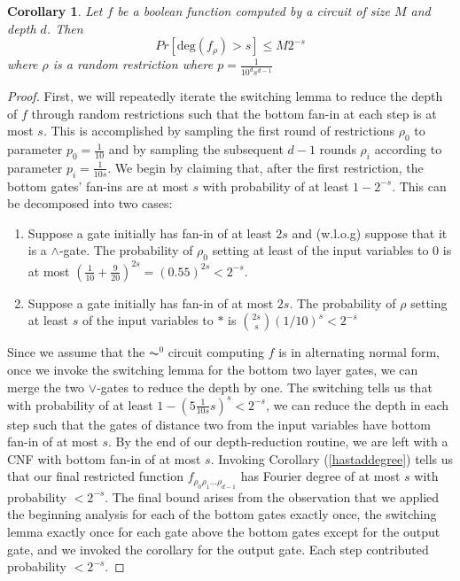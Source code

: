 \documentclass{amsart}
\newtheorem{corollary}{Corollary}[theorem]
\theoremstyle{definition}
\theoremstyle{remark}
\numberwithin{equation}{section}
\theoremstyle{remark}
\begin{document}
\begin{corollary} \label{fouriertail}
  Let $f$ be a boolean function computed by a circuit of size $M$ and depth $d$. Then
  $$ Pr[\text{deg}(f_{\rho}) > s] \leq M2^{-s} $$
  where $\rho$ is a random restriction where $p = \frac{1}{10^ds^{d-1}}$
\end{corollary}
%
\begin{proof}
   First, we will repeatedly iterate the switching lemma to reduce the depth of $f$ through random restrictions such that the bottom fan-in at each step is at most $s$. This is accomplished by sampling the first round of restrictions $\rho_0$ to parameter $p_0 = \frac{1}{10}$ and by sampling the subsequent $d-1$ rounds $\rho_i$ according to parameter $p_i = \frac{1}{10s}$. We begin by claiming that, after the first restriction, the bottom gates' fan-ins are at most $s$ with probability of at least $1 - 2^{-s}$. This can be decomposed into two cases:
   \begin{enumerate}
     \item Suppose a gate initially has fan-in of at least $2s$ and (w.l.o.g) suppose that it is a $\wedge$-gate. The probability of $\rho_0$ setting at least of the input variables to $0$ is at most $(\frac{1}{10} + \frac{9}{20})^{2s} = (0.55)^{2s} < 2^{-s}$.
     \item Suppose a gate initially has fan-in of at most $2s$. The probability of $\rho$ setting at least $s$ of the input variables to $*$ is ${2s \choose s}(1/10)^s < 2^{-s}$
   \end{enumerate}
  Since we assume that the $\AC^0$ circuit computing $f$ is in alternating normal form, once we invoke the switching lemma for the bottom two layer gates, we can merge the two $\vee$-gates to reduce the depth by one. The switching tells us that with probability of at least $1 - (5\frac{1}{10s}s)^s < 2^{-s}$, we can reduce the depth in each step such that the gates of distance two from the input variables have bottom fan-in of at most $s$. By the end of our depth-reduction routine, we are left with a CNF with bottom fan-in of at most $s$. Invoking Corollary (\ref{hastaddegree}) tells us that our final restricted function $f_{\rho_0\rho_1...\rho_{d-1}}$ has Fourier degree of at most $s$ with probability $< 2^{-s}$. The final bound arises from the observation that we applied the beginning analysis for each of the bottom gates exactly once, the switching lemma exactly once for each gate above the bottom gates except for the output gate, and we invoked the corollary for the output gate. Each step contributed probability $< 2^{-s}$.
\end{proof}
\end{document}
